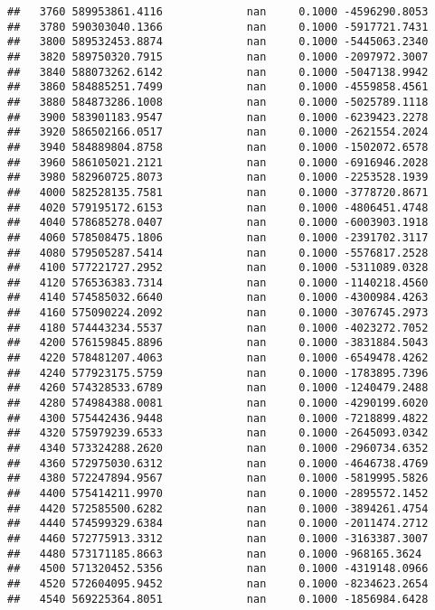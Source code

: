 \documentclass[
]{article}
\begin{document}
\begin{verbatim}
##   3760 589953861.4116             nan     0.1000 -4596290.8053
##   3780 590303040.1366             nan     0.1000 -5917721.7431
##   3800 589532453.8874             nan     0.1000 -5445063.2340
##   3820 589750320.7915             nan     0.1000 -2097972.3007
##   3840 588073262.6142             nan     0.1000 -5047138.9942
##   3860 584885251.7499             nan     0.1000 -4559858.4561
##   3880 584873286.1008             nan     0.1000 -5025789.1118
##   3900 583901183.9547             nan     0.1000 -6239423.2278
##   3920 586502166.0517             nan     0.1000 -2621554.2024
##   3940 584889804.8758             nan     0.1000 -1502072.6578
##   3960 586105021.2121             nan     0.1000 -6916946.2028
##   3980 582960725.8073             nan     0.1000 -2253528.1939
##   4000 582528135.7581             nan     0.1000 -3778720.8671
##   4020 579195172.6153             nan     0.1000 -4806451.4748
##   4040 578685278.0407             nan     0.1000 -6003903.1918
##   4060 578508475.1806             nan     0.1000 -2391702.3117
##   4080 579505287.5414             nan     0.1000 -5576817.2528
##   4100 577221727.2952             nan     0.1000 -5311089.0328
##   4120 576536383.7314             nan     0.1000 -1140218.4560
##   4140 574585032.6640             nan     0.1000 -4300984.4263
##   4160 575090224.2092             nan     0.1000 -3076745.2973
##   4180 574443234.5537             nan     0.1000 -4023272.7052
##   4200 576159845.8896             nan     0.1000 -3831884.5043
##   4220 578481207.4063             nan     0.1000 -6549478.4262
##   4240 577923175.5759             nan     0.1000 -1783895.7396
##   4260 574328533.6789             nan     0.1000 -1240479.2488
##   4280 574984388.0081             nan     0.1000 -4290199.6020
##   4300 575442436.9448             nan     0.1000 -7218899.4822
##   4320 575979239.6533             nan     0.1000 -2645093.0342
##   4340 573324288.2620             nan     0.1000 -2960734.6352
##   4360 572975030.6312             nan     0.1000 -4646738.4769
##   4380 572247894.9567             nan     0.1000 -5819995.5826
##   4400 575414211.9970             nan     0.1000 -2895572.1452
##   4420 572585500.6282             nan     0.1000 -3894261.4754
##   4440 574599329.6384             nan     0.1000 -2011474.2712
##   4460 572775913.3312             nan     0.1000 -3163387.3007
##   4480 573171185.8663             nan     0.1000 -968165.3624
##   4500 571320452.5356             nan     0.1000 -4319148.0966
##   4520 572604095.9452             nan     0.1000 -8234623.2654
##   4540 569225364.8051             nan     0.1000 -1856984.6428

\end{verbatim}
\end{document}
